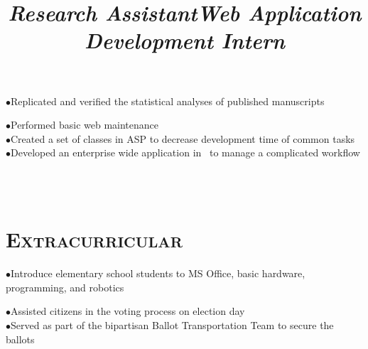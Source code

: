 \begin{resume}
\title{\textit{Research Assistant}}
\begin{position}
$\bullet$Replicated and verified the statistical analyses of published manuscripts
\end{position}


\title{\textit{Web Application Development Intern}}
\begin{position}
$\bullet$Performed basic web maintenance \\
$\bullet$Created a set of classes in ASP to decrease development time of common tasks \\
$\bullet$Developed an enterprise wide application in \CSharp \ to manage a complicated workflow 
\end{position}


\begin{formatb}
  \\
  \body\\
\end{formatb}

\section{\textsc{Extracurricular}}
\begin{position}
$\bullet$Introduce elementary school students to MS Office, basic hardware, programming, and robotics
\end{position}

\begin{position}
$\bullet$Assisted citizens in the voting process on election day \\
$\bullet$Served as part of the bipartisan Ballot Transportation Team to secure the ballots
\end{position}



\end{resume}


